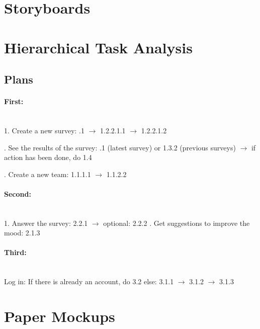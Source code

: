 \documentclass[11pt]{report}
\begin{document}
\section{Storyboards}



\section{Hierarchical Task Analysis}

\subsection{Plans}

\paragraph{First:}\mbox{}\\
1. Create a new survey:
.1 $\rightarrow$ 1.2.2.1.1 $\rightarrow$ 1.2.2.1.2
\newline

. See the results of the survey:
.1 (latest survey) or 1.3.2 (previous surveys)
\newline
$\rightarrow$ if action has been done, do 1.4
\newline

. Create a new team: 1.1.1.1 $\rightarrow$ 1.1.2.2 
 
\paragraph{Second:}\mbox{}\\
1. Answer the survey: 2.2.1 $\rightarrow$ optional: 2.2.2
\newline
{}. Get suggestions to improve the mood: 2.1.3

\paragraph{Third:}\mbox{}\\
Log in: If there is already an account, do 3.2
\newline else: 3.1.1 $\rightarrow$ 3.1.2 $\rightarrow$ 3.1.3

\section{Paper Mockups}
\end{document}
